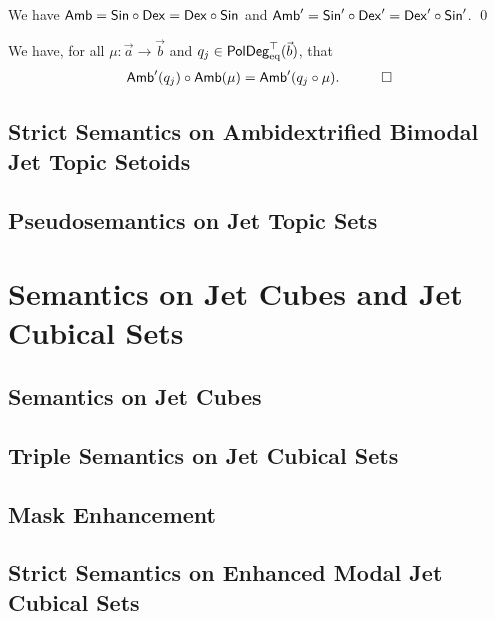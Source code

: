 \documentclass[a4paper]{memoir}
\begin{document}
\begin{theorem}
	We have ${\mathsf{Amb}} = {\mathsf{Sin}} \circ {\mathsf{Dex}} = {\mathsf{Dex}} \circ {\mathsf{Sin}}$ and ${\mathsf{Amb}}' = {\mathsf{Sin}}' \circ {\mathsf{Dex}}' = {\mathsf{Dex}}' \circ {\mathsf{Sin}}'$. \qed
\end{theorem}
\begin{corollary}
	We have, for all $\mu : \vec a \to \vec b$ and $q_j \in \mathsf{PolDeg}_{\mathrm{eq}}^\top(\vec b)$, that
	\begin{align*}
		{\mathsf{Amb}}'(q_j) \circ {\mathsf{Amb}}(\mu) &= {\mathsf{Amb}}'(q_j \circ \mu). &\qed
	\end{align*}
\end{corollary}

\subsection{Strict Semantics on Ambidextrified Bimodal Jet Topic Setoids} \label{sec:poresh-jtset:strict}

\subsection{Pseudosemantics on Jet Topic Sets} \label{sec:poresh-jtset:pseudo}

\section{Semantics on Jet Cubes and Jet Cubical Sets} \label{sec:poresh-jetcube-jcset}

\subsection{Semantics on Jet Cubes} \label{sec:poresh-jetcube}

\subsection{Triple Semantics on Jet Cubical Sets} \label{sec:poresh-jcset:triple}

\subsection{Mask Enhancement} \label{sec:poresh-jcset:enhancement}

\subsection{Strict Semantics on Enhanced Modal Jet Cubical Sets} \label{sec:poresh-jcset:strict}
\end{document}
